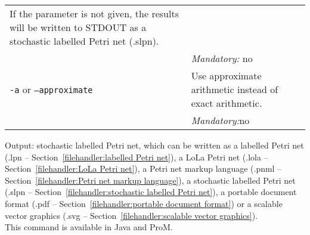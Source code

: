 {\begin{tabularx}{\linewidth}{lX}
If the parameter is not given, the results will be written to STDOUT as a stochastic labelled Petri net (.slpn).\\
&\textit{Mandatory:} \quad no\\
\texttt{-a} or \texttt{--approximate} & Use approximate arithmetic instead of exact arithmetic.\\
&\textit{Mandatory:}\quad no\\
\bottomrule
\end{tabularx}
\noindent Output: stochastic labelled Petri net, which can be written as a labelled Petri net (.lpn -- Section~\ref{filehandler:labelled Petri net}), a LoLa Petri net (.lola -- Section~\ref{filehandler:LoLa Petri net}), a Petri net markup language (.pnml -- Section~\ref{filehandler:Petri net markup language}), a stochastic labelled Petri net (.slpn -- Section~\ref{filehandler:stochastic labelled Petri net}), a portable document format (.pdf -- Section~\ref{filehandler:portable document format}) or a scalable vector graphics (.svg -- Section~\ref{filehandler:scalable vector graphics}).
\\This command is available in Java and ProM.
}
